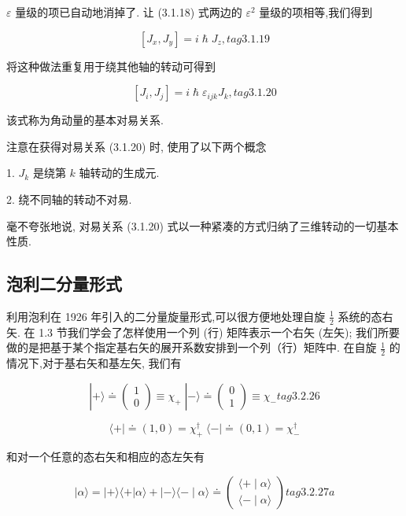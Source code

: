 $\varepsilon$ 量级的项已自动地消掉了. 让 (3.1.18) 式两边的 ${\varepsilon }^{2}$ 量级的项相等,我们得到

$$
\left\lbrack {{J}_{x},{J}_{y}}\right\rbrack = i\hslash {J}_{z}, tag{3.1.19}
$$

将这种做法重复用于绕其他轴的转动可得到

$$
\left\lbrack {{J}_{i},{J}_{j}}\right\rbrack = i\hslash {\varepsilon }_{ijk}{J}_{k}, tag{3.1.20}
$$

该式称为角动量的基本对易关系.

注意在获得对易关系 (3.1.20) 时, 使用了以下两个概念

1. ${J}_{k}$ 是绕第 $k$ 轴转动的生成元.

2. 绕不同轴的转动不对易.

毫不夸张地说, 对易关系 (3.1.20) 式以一种紧凑的方式归纳了三维转动的一切基本性质.


\subsection{泡利二分量形式} 

利用泡利在 1926 年引入的二分量旋量形式,可以很方便地处理自旋 $\frac{1}{2}$ 系统的态右矢. 在 1.3 节我们学会了怎样使用一个列 (行) 矩阵表示一个右矢 (左矢); 我们所要做的是把基于某个指定基右矢的展开系数安排到一个列（行）矩阵中. 在自旋 $\frac{1}{2}$ 的情况下,对于基右矢和基左矢, 我们有

$$
\left| {+\rangle \doteq \left( \begin{array}{l} 1 \\ 0 \end{array}\right) \equiv {\chi }_{ + }\;}\right| - \rangle \doteq \left( \begin{array}{l} 0 \\ 1 \end{array}\right) \equiv {\chi }_{ - } tag{3.2.26}
$$

$$
\langle + \mid \doteq \left( {1,0}\right) = {\chi }_{ + }^{ \dagger }\;\langle - \mid \doteq \left( {0,1}\right) = {\chi }_{ - }^{ \dagger }
$$

和对一个任意的态右矢和相应的态左矢有

$$
\left| {\alpha \rangle = }\right| + \rangle \langle + \left| {\alpha \rangle + }\right| - \rangle \langle - \mid \alpha \rangle \doteq \left( \begin{array}{l} \langle + \mid \alpha \rangle \\ \langle - \mid \alpha \rangle \end{array}\right) tag{3.2.27a}
$$

